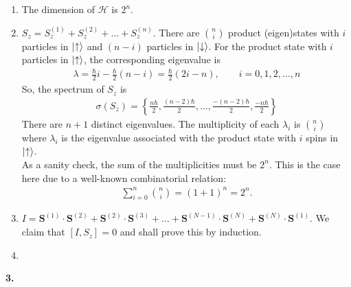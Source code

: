 \documentclass{article}
\theoremstyle{definition}
\newcommand{\ham}{\mathcal{H}}
\newcommand{\f}[2]{\frac{#1}{#2}}
\newcommand{\lp}{\left(}
\newcommand{\rp}{\right)}
\newcommand{\lc}{\left\{}
\newcommand{\rc}{\right\}}
\begin{document}
\begin{enumerate}[label=(\alph*)]
	\item The dimension of $\ham$ is $2^n$.
	
	\item $S_z = S_z^{(1)} + S_z^{(2)} + \dots + S_z^{(n)}$. There are ${n\choose i}$ product (eigen)states with $i$ particles in $\ket{\uparrow}$ and $(n-i)$ particles in $\ket{\downarrow}$. For the product state with $i$ particles in $\ket{\uparrow}$, the corresponding eigenvalue is 
	\begin{align*}
	\lambda = \f{\hbar}{2}i - \f{\hbar}{2}(n-i) = \f{\hbar}{2}\lp 2i-n \rp,\quad\quad i = 0,1,2,\dots,n
	\end{align*}
	So, the spectrum of $S_z$ is 
	\begin{align*}
	\sigma(S_z) = \lc \f{n\hbar}{2}, \f{(n-2)\hbar}{2},\dots, \f{-(n-2)\hbar}{2}, \f{-n\hbar}{2}   \rc
	\end{align*}
	There are $n+1$ distinct eigenvalues. The multiplicity of each $\lambda_i$ is ${n\choose{i}}$ where $\lambda_i$ is the eigenvalue associated with the product state with $i$ spins in $\ket{\uparrow}$. \\
	
	As a sanity check, the sum of the multiplicities must be $2^n$. This is the case here due to a well-known combinatorial relation:
	\begin{align*}
	\sum_{i=0}^n {n\choose{i}} = (1+1)^n = 2^n.
	\end{align*}
	
	\item $I = \mathbf{S}^{(1)}\cdot \mathbf{S}^{(2)}+ \mathbf{S}^{(2)}\cdot \mathbf{S}^{(3)} + \dots + \mathbf{S}^{(N-1)}\cdot \mathbf{S}^{(N)}+ \mathbf{S}^{(N)}\cdot \mathbf{S}^{(1)}$. We claim that $[I,S_z] = 0$ and shall prove this by induction.\\
	
	
	 
	
	
	\item 
\end{enumerate}





\noindent \textbf{3. }




	
\end{document}
